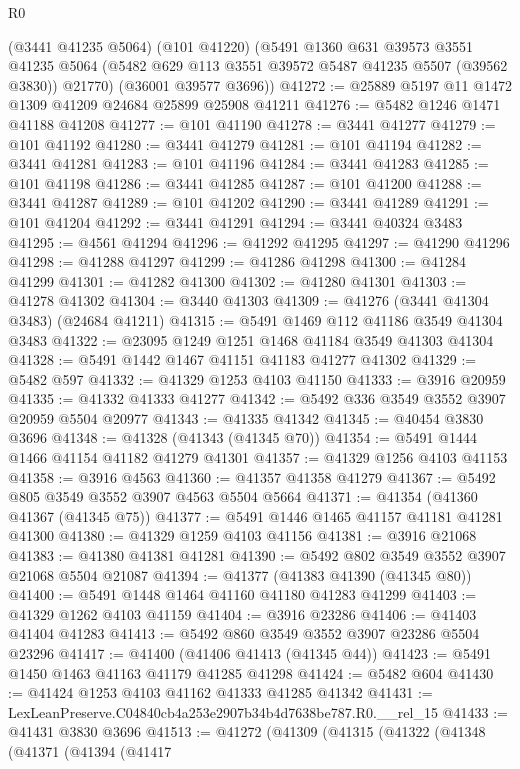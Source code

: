 \begin{lexlean}{R0}
\begin{coremodule}
      (@3441 @41235 @5064)
      (@101 @41220)
      (@5491
        @1360
        @631
        @39573
        @3551
        @41235
        @5064
        (@5482 @629 @113 @3551 @39572 @5487 @41235 @5507 (@39562 @3830))
        @21770)
      (@36001 @39577 @3696))
@41272 := @25889 @5197 @11 @1472 @1309 @41209 @24684 @25899 @25908 @41211
@41276 := @5482 @1246 @1471 @41188 @41208
@41277 := @101 @41190
@41278 := @3441 @41277
@41279 := @101 @41192
@41280 := @3441 @41279
@41281 := @101 @41194
@41282 := @3441 @41281
@41283 := @101 @41196
@41284 := @3441 @41283
@41285 := @101 @41198
@41286 := @3441 @41285
@41287 := @101 @41200
@41288 := @3441 @41287
@41289 := @101 @41202
@41290 := @3441 @41289
@41291 := @101 @41204
@41292 := @3441 @41291
@41294 := @3441 @40324 @3483
@41295 := @4561 @41294
@41296 := @41292 @41295
@41297 := @41290 @41296
@41298 := @41288 @41297
@41299 := @41286 @41298
@41300 := @41284 @41299
@41301 := @41282 @41300
@41302 := @41280 @41301
@41303 := @41278 @41302
@41304 := @3440 @41303
@41309 := @41276 (@3441 @41304 @3483) (@24684 @41211)
@41315 := @5491 @1469 @112 @41186 @3549 @41304 @3483
@41322 := @23095 @1249 @1251 @1468 @41184 @3549 @41303 @41304
@41328 := @5491 @1442 @1467 @41151 @41183 @41277 @41302
@41329 := @5482 @597
@41332 := @41329 @1253 @4103 @41150
@41333 := @3916 @20959
@41335 := @41332 @41333 @41277
@41342 := @5492 @336 @3549 @3552 @3907 @20959 @5504 @20977
@41343 := @41335 @41342
@41345 := @40454 @3830 @3696
@41348 := @41328 (@41343 (@41345 @70))
@41354 := @5491 @1444 @1466 @41154 @41182 @41279 @41301
@41357 := @41329 @1256 @4103 @41153
@41358 := @3916 @4563
@41360 := @41357 @41358 @41279
@41367 := @5492 @805 @3549 @3552 @3907 @4563 @5504 @5664
@41371 := @41354 (@41360 @41367 (@41345 @75))
@41377 := @5491 @1446 @1465 @41157 @41181 @41281 @41300
@41380 := @41329 @1259 @4103 @41156
@41381 := @3916 @21068
@41383 := @41380 @41381 @41281
@41390 := @5492 @802 @3549 @3552 @3907 @21068 @5504 @21087
@41394 := @41377 (@41383 @41390 (@41345 @80))
@41400 := @5491 @1448 @1464 @41160 @41180 @41283 @41299
@41403 := @41329 @1262 @4103 @41159
@41404 := @3916 @23286
@41406 := @41403 @41404 @41283
@41413 := @5492 @860 @3549 @3552 @3907 @23286 @5504 @23296
@41417 := @41400 (@41406 @41413 (@41345 @44))
@41423 := @5491 @1450 @1463 @41163 @41179 @41285 @41298
@41424 := @5482 @604
@41430 := @41424 @1253 @4103 @41162 @41333 @41285 @41342
@41431 := LexLeanPreserve.C04840cb4a253e2907b34b4d7638be787.R0.__rel_15
@41433 := @41431 @3830 @3696
@41513 := @41272
    (@41309
      (@41315
        (@41322
          (@41348
            (@41371
              (@41394
                (@41417

\end{coremodule}
\end{lexlean}

